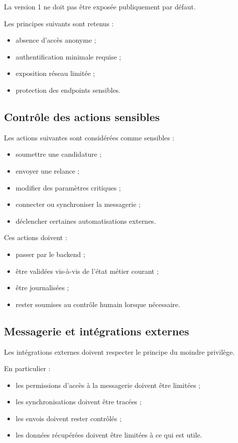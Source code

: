 \documentclass[11pt,a4paper]{article}
\begin{document}
La version 1 ne doit pas être exposée publiquement par défaut.

Les principes suivants sont retenus :

\begin{itemize}
    \item absence d’accès anonyme ;
    \item authentification minimale requise ;
    \item exposition réseau limitée ;
    \item protection des endpoints sensibles.
\end{itemize}

\subsection{Contrôle des actions sensibles}

Les actions suivantes sont considérées comme sensibles :

\begin{itemize}
    \item soumettre une candidature ;
    \item envoyer une relance ;
    \item modifier des paramètres critiques ;
    \item connecter ou synchroniser la messagerie ;
    \item déclencher certaines automatisations externes.
\end{itemize}

Ces actions doivent :

\begin{itemize}
    \item passer par le backend ;
    \item être validées vis-à-vis de l’état métier courant ;
    \item être journalisées ;
    \item rester soumises au contrôle humain lorsque nécessaire.
\end{itemize}

\subsection{Messagerie et intégrations externes}

Les intégrations externes doivent respecter le principe du moindre privilège.

En particulier :

\begin{itemize}
    \item les permissions d’accès à la messagerie doivent être limitées ;
    \item les synchronisations doivent être tracées ;
    \item les envois doivent rester contrôlés ;
    \item les données récupérées doivent être limitées à ce qui est utile.
\end{itemize}
\end{document}

